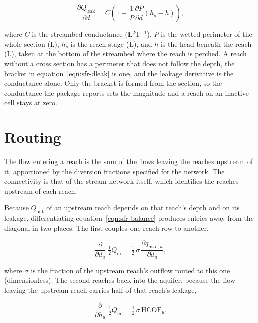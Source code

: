 \begin{equation}
	\label{eqn:sfr-dleak}
	\frac{\partial Q_{\mathrm{leak}}}{\partial d} = C \left(
	1 + \frac{1}{P} \frac{\partial P}{\partial d}
	\left( h_{s} - h \right) \right),
\end{equation}

\noindent where $C$ is the streambed conductance (L$^{2}$T$^{-1}$), $P$ is the wetted perimeter of the whole section (L), $h_{s}$ is the reach stage (L), and $h$ is the head beneath the reach (L), taken at the bottom of the streambed where the reach is perched. A reach without a cross section has a perimeter that does not follow the depth, the bracket in equation~\ref{eqn:sfr-dleak} is one, and the leakage derivative is the conductance alone. Only the bracket is formed from the section, so the conductance the package reports sets the magnitude and a reach on an inactive cell stays at zero.

\section*{Routing}

The flow entering a reach is the sum of the flows leaving the reaches upstream of it, apportioned by the diversion fractions specified for the network. The connectivity is that of the stream network itself, which identifies the reaches upstream of each reach.

Because $Q_{\mathrm{out}}$ of an upstream reach depends on that reach's depth and on its leakage, differentiating equation~\ref{eqn:sfr-balance} produces entries away from the diagonal in two places. The first couples one reach row to another,

\begin{equation}
	\label{eqn:sfr-updepth}
	\frac{\partial}{\partial d_{u}} \; \tfrac{1}{2} Q_{\mathrm{in}} =
	\tfrac{1}{2}\, \sigma \, \frac{\partial q_{\mathrm{man},u}}
	{\partial d_{u}},
\end{equation}

\noindent where $\sigma$ is the fraction of the upstream reach's outflow routed to this one (dimensionless). The second reaches back into the aquifer, because the flow leaving the upstream reach carries half of that reach's leakage,

\begin{equation}
	\label{eqn:sfr-uphead}
	\frac{\partial}{\partial h_{u}} \; \tfrac{1}{2} Q_{\mathrm{in}} =
	\tfrac{1}{2}\, \sigma \, \mathrm{HCOF}_{u}.
\end{equation}

